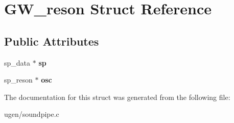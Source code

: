 \hypertarget{structGW__reson}{}\section{G\+W\+\_\+reson Struct Reference}
\label{structGW__reson}
\subsection*{Public Attributes}
\begin{DoxyCompactItemize}
\item 
\hypertarget{structGW__reson_a7832f05b5f72d75dbcdaeb3273bfb4f2}{}\label{structGW__reson_a7832f05b5f72d75dbcdaeb3273bfb4f2} 
sp\+\_\+data $\ast$ {\bfseries sp}
\item 
\hypertarget{structGW__reson_a5b379203708684a021bb2dcedff62c44}{}\label{structGW__reson_a5b379203708684a021bb2dcedff62c44} 
sp\+\_\+reson $\ast$ {\bfseries osc}
\end{DoxyCompactItemize}


The documentation for this struct was generated from the following file\+:\begin{DoxyCompactItemize}
\item 
ugen/soundpipe.\+c\end{DoxyCompactItemize}
